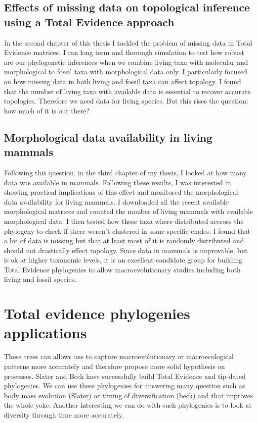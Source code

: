 \subsection{Effects of missing data on topological inference using a Total Evidence approach}
In the second chapter of this thesis I tackled the problem of missing data in Total Evidence matrices.
I ran long term and thorough simulation to test how robust are our phylogenetic inferences when we combine living taxa with molecular and morphological to fossil taxa with morphological data only.
I particularly focused on how missing data in both living and fossil taxa can affect topology.
I found that the number of living taxa with available data is essential to recover accurate topologies.
Therefore we need data for living species.
But this rises the question: how much of it is out there?

\subsection{Morphological data availability in living mammals}
Following this question, in the third chapter of my thesis, I looked at how many data was available in mammals.
Following these results, I was interested in showing practical implications of this effect and monitored the morphological data availability for living mammals.
I downloaded all the recent available morphological matrices and counted the number of living mammals with available morphological data.
I then tested how these taxa where distributed accross the phylogeny to check if there weren't clustered in some specific clades.
I found that a lot of data is missing but that at least most of it is randomly distributed and should not drastically effect topology.
Since data in mammals is improvable, but is ok at higher taxonomic levels, it is an excellent candidate group for building Total Evidence phylogenies to allow macroevolutionary studies including both living and fossil species.

\section{Total evidence phylogenies applications}
These trees can allows use to capture macroevolutionary or macroecological patterns more accurately and therefore propose more solid hypothesis on processes.
Slater and Beck have successfully build Total Evidence and tip-dated phylogenies.
We can use these phylogenies for answering many question such as body mass evolution (Slater) or timing of diversification (beck) and that improves the whole yoke.
Another interesting we can do with such phylogenies is to look at diversity through time more accurately.

